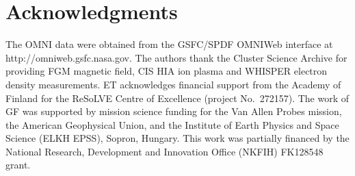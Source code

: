 \documentclass[b5paper,10pt]{article}
\begin{document}
\section*{Acknowledgments}

The OMNI data were obtained from the GSFC/SPDF OMNIWeb interface at http://omniweb.gsfc.nasa.gov. The authors thank %
the Cluster Science Archive for providing FGM magnetic field, CIS HIA ion plasma and WHISPER electron density measurements. %
ET acknowledges financial support from the Academy of Finland for the ReSoLVE Centre of Excellence (project No.~272157).
The work of GF was supported by mission science funding for the Van Allen Probes mission, the American Geophysical Union, and the Institute of Earth Physics and Space Science (ELKH EPSS), Sopron, Hungary. This work was partially financed by the National Research, Development and Innovation Office (NKFIH) FK128548 grant. 








\end{document}
